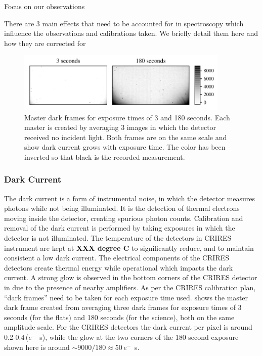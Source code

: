 Focus on our observations

There are 3 main effects that need to be accounted for in {\nir} spectroscopy which influence the observations and calibrations taken. We briefly detail them here and how they are corrected for

\begin{figure}[h]
\centering
\includegraphics[width=0.9\textwidth]{figures/reduction/master_darks_1.pdf}
\caption{Master dark frames for exposure times of  3 and 180 seconds. Each master is created by averaging 3 images in which the detector received no incident light. Both frames are on the same scale and show dark current grows with exposure time. The color has been inverted so that black is the recorded measurement.}
\label{fig:darkcurrent}
\end{figure}

\subsubsection{Dark Current}
The dark current is a form of instrumental noise, in which the detector measures photons while not being illuminated. It is the detection of thermal electrons moving inside the detector, creating spurious photon counts. Calibration and removal of the dark current is performed by taking exposures in which the detector is not illuminated. 
 The temperature of the detectors in CRIRES instrument are kept at \textbf{XXX degree C} to significantly reduce, and to maintain consistent a low dark current. The electrical components of the CRIRES detectors create thermal energy while operational which impacts the dark current. A strong glow is observed in the bottom corners of the CRIRES detector in  due to the presence of nearby amplifiers. As per the CRIRES calibration plan, ``dark frames'' need to be taken for each exposure time used.  shows the master dark frame created from averaging three dark frames for exposure times of 3 seconds (for the flats) and 180 seconds (for the science), both on the same amplitude scale.
For the CRIRES detectors the dark current per pixel is around 0.2-0.4\,(\(e^{-}\)\si{\per\second}), while the glow at the two corners of the 180 second exposure shown here is around \(\sim9000 / 180\approx50\)\,\(e^{-}\)\si{\per\second}.


